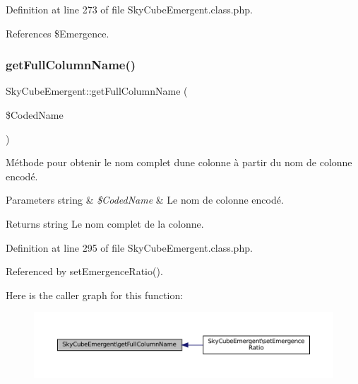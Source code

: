 Definition at line 273 of file Sky\+Cube\+Emergent.\+class.\+php.



References \$\+Emergence.

\mbox{\label{class_sky_cube_emergent_a95634c4bc29bfe9aa749d913d87bc435}} 
\subsubsection{\texorpdfstring{get\+Full\+Column\+Name()}{getFullColumnName()}}
{\footnotesize\ttfamily Sky\+Cube\+Emergent\+::get\+Full\+Column\+Name (\begin{DoxyParamCaption}\item[{}]{\$\+Coded\+Name }\end{DoxyParamCaption})}

Méthode pour obtenir le nom complet d\textquotesingle{}une colonne à partir du nom de colonne encodé.


\begin{DoxyParams}[1]{Parameters}
string & {\em \$\+Coded\+Name} & Le nom de colonne encodé. \\
\hline
\end{DoxyParams}
\begin{DoxyReturn}{Returns}
string Le nom complet de la colonne. 
\end{DoxyReturn}


Definition at line 295 of file Sky\+Cube\+Emergent.\+class.\+php.



Referenced by set\+Emergence\+Ratio().

Here is the caller graph for this function\+:\nopagebreak
\begin{figure}[H]
\begin{center}
\leavevmode
\includegraphics[width=350pt]{class_sky_cube_emergent_a95634c4bc29bfe9aa749d913d87bc435_icgraph}
\end{center}
\end{figure}
\mbox{\label{class_sky_cube_emergent_a7b3d1065a82ab98551cddf73736ca0dd}} 
